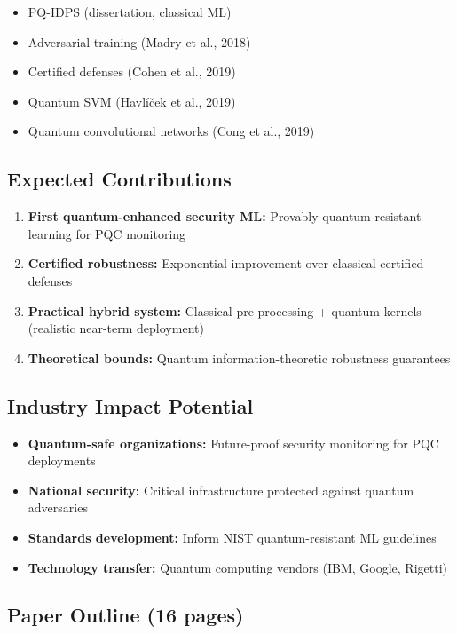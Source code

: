 \documentclass[11pt,letterpaper]{article}
\begin{document}
\begin{itemize}
\item PQ-IDPS (dissertation, classical ML)
\item Adversarial training (Madry et al., 2018)
\item Certified defenses (Cohen et al., 2019)
\item Quantum SVM (Havlíček et al., 2019)
\item Quantum convolutional networks (Cong et al., 2019)
\end{itemize}

\subsection{Expected Contributions}

\begin{enumerate}
\item \textbf{First quantum-enhanced security ML:} Provably quantum-resistant learning for PQC monitoring
\item \textbf{Certified robustness:} Exponential improvement over classical certified defenses
\item \textbf{Practical hybrid system:} Classical pre-processing + quantum kernels (realistic near-term deployment)
\item \textbf{Theoretical bounds:} Quantum information-theoretic robustness guarantees
\end{enumerate}

\subsection{Industry Impact Potential}

\begin{itemize}
\item \textbf{Quantum-safe organizations:} Future-proof security monitoring for PQC deployments
\item \textbf{National security:} Critical infrastructure protected against quantum adversaries
\item \textbf{Standards development:} Inform NIST quantum-resistant ML guidelines
\item \textbf{Technology transfer:} Quantum computing vendors (IBM, Google, Rigetti)
\end{itemize}

\subsection{Paper Outline (16 pages)}
\end{document}

